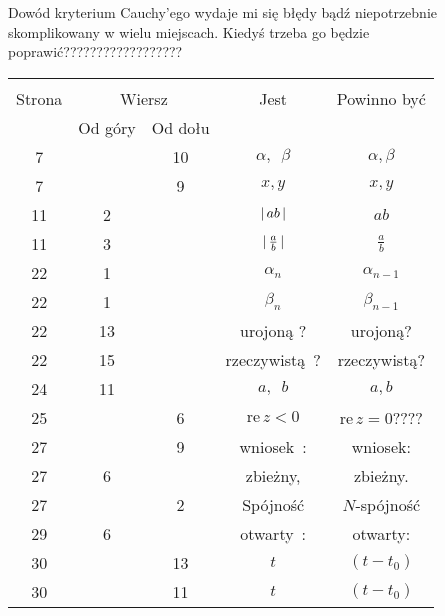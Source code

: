 \documentclass[a4paper,11pt]{article}
\begin{document}
\vspace{\spaceFour}



\start {} Dowód kryterium Cauchy'ego wydaje mi się błędy bądź
niepotrzebnie skomplikowany w wielu miejscach. Kiedyś trzeba go będzie
poprawić??????????????????

\vspace{\spaceFour}










\newpage
{}

\begin{center}

  \begin{tabular}{|c|c|c|c|c|}
    \hline
    & \multicolumn{2}{c|}{} & & \\
    Strona & \multicolumn{2}{c|}{Wiersz} & Jest
                              & Powinno być \\ \cline{2-3}
    & Od góry & Od dołu & & \\
    \hline
    7   & & 10 & $\alpha,\:\; \beta$ & $\alpha, \beta$ \\
    7   & &  9 & $x,\! y$ & $x, y$ \\
    11  &  2 & & $|\, {  a b  } \,|$ & $ab$ \\
    11  &  3 & & $|\, {  \tfrac{ a }{ b }  } \,|$ & $\tfrac{ a }{ b }$ \\
    22  &  1 & & $\alpha_{ n }$ & $\alpha_{ n - 1 }$ \\
    22  &  1 & & $\beta_{ n }$ & $\beta_{ n - 1 }$ \\
    22  & 13 & & urojoną ? & urojoną? \\
    22  & 15 & & rzeczywistą~? & rzeczywistą? \\
    24  & 11 & & $a, \:\; b$ & $a, b$ \\
    25  & &  6 & $\textrm{re}\, z < 0$ & $\textrm{re}\, z = 0$???? \\
    27  & &  9 & wniosek~: & wniosek: \\
    27  &  6 & & zbieżny, & zbieżny. \\
    27  & &  2 & Spójność & $N$-spójność \\
    29  &  6 & & otwarty~: & otwarty: \\
    30  & & 13 & $t$ & $( t - t_{ 0 } )$ \\
    30  & & 11 & $t$ & $( t - t_{ 0 } )$ \\

\end{tabular}
\end{center}
\end{document}
